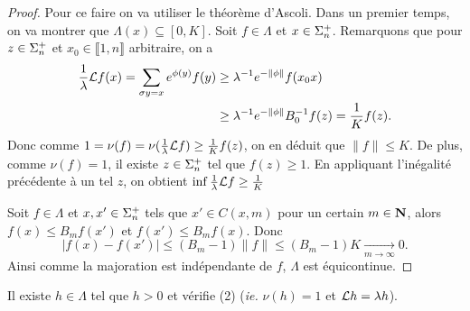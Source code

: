  \begin{proof}
    Pour ce faire on va utiliser le théorème d'Ascoli. Dans un premier temps, on va montrer que $\Lambda(x) \subseteq [0, K]$.
    Soit $f \in \Lambda$ et $x \in \sp_n$. Remarquons que pour $z \in \sp_n$ et $x_0 \in \llbracket 1, n \rrbracket$ arbitraire, on a
    \begin{align*}
      \frac 1 \lambda \L f(x) = \sum_{\sigma y = x}{e^{\phi(y)}f(y)} &\geq \lambda^{-1}e^{-\lVert\phi\rVert}f(x_0x) \\
								     &\geq \lambda^{-1}e^{-\lVert\phi\rVert}B_0^{-1}f(z) = \frac 1 K f(z).
    \end{align*}
    Donc comme $1 = \nu(f) = \nu(\frac 1 \lambda \L f) \geq \frac 1 K f(z)$, on en déduit que $\lVert f\rVert \leq K$.
    De plus, comme $\nu(f) = 1$, il existe $z \in \sp_n$ tel que $f(z) \geq 1$. En appliquant l'inégalité précédente à un tel $z$,
    on obtient $\inf{\frac 1 \lambda \L f} \geq \frac 1 K$

    Soit $f \in \Lambda$ et $x, x' \in \sp_n$ tels que $x' \in C(x, m)$ pour un certain $m \in \N$,
    alors $f(x) \leq B_mf(x')$ et $f(x') \leq B_mf(x)$. Donc
    $$\left|f(x) - f(x')\right| \leq (B_m - 1)\lVert f\rVert \leq (B_m - 1)K \underset{m\to\infty}{\longrightarrow} 0.$$
    Ainsi comme la majoration est indépendante de $f$, $\Lambda$ est équicontinue.
  \end{proof}

  \begin{proposition}
    \label{prop:rpf_2}
    Il existe $h \in \Lambda$ tel que $h > 0$ et vérifie (2) (\textit{ie.} $\nu(h) = 1$ et $\L h = \lambda h$).
  \end{proposition}

